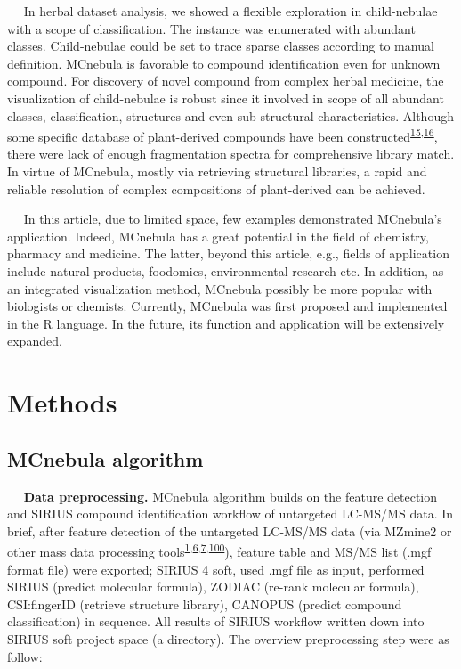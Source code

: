    In herbal dataset analysis, we showed a flexible exploration in
child-nebulae with a scope of classification. The instance was
enumerated with abundant classes. Child-nebulae could be set to trace
sparse classes according to manual definition. MCnebula is favorable to
compound identification even for unknown compound. For discovery of
novel compound from complex herbal medicine, the visualization of
child-nebulae is robust since it involved in scope of all abundant
classes, classification, structures and even sub-structural
characteristics. Although some specific database of plant-derived
compounds have been
constructed\textsuperscript{\protect\hyperlink{ref-2012ac}{15},\protect\hyperlink{ref-2015ak}{16}},
there were lack of enough fragmentation spectra for comprehensive
library match. In virtue of MCnebula, mostly via retrieving structural
libraries, a rapid and reliable resolution of complex compositions of
plant-derived can be achieved.

   In this article, due to limited space, few examples demonstrated
MCnebula's application. Indeed, MCnebula has a great potential in the
field of chemistry, pharmacy and medicine. The latter, beyond this
article, e.g., fields of application include natural products,
foodomics, environmental research etc. In addition, as an integrated
visualization method, MCnebula possibly be more popular with biologists
or chemists. Currently, MCnebula was first proposed and implemented in
the R language. In the future, its function and application will be
extensively expanded.

\hypertarget{methods}{%
\section{\texorpdfstring{\textbf{Methods}}{Methods}}\label{methods}}

\hypertarget{mcnebula-algorithm}{%
\subsection{\texorpdfstring{\textbf{MCnebula
algorithm}}{MCnebula algorithm}}\label{mcnebula-algorithm}}

   \textbf{Data preprocessing.} MCnebula algorithm builds on the feature
detection and SIRIUS compound identification workflow of untargeted
LC-MS/MS data. In brief, after feature detection of the untargeted
LC-MS/MS data (via MZmine2 or other mass data processing
tools\textsuperscript{\protect\hyperlink{ref-2020p}{1},\protect\hyperlink{ref-2016e}{6},\protect\hyperlink{ref-2006a}{7},\protect\hyperlink{ref-2010a}{100}}),
feature table and MS/MS list (.mgf format file) were exported; SIRIUS 4
soft, used .mgf file as input, performed SIRIUS (predict molecular
formula), ZODIAC (re-rank molecular formula), CSI:fingerID (retrieve
structure library), CANOPUS (predict compound classification) in
sequence. All results of SIRIUS workflow written down into SIRIUS soft
project space (a directory). The overview preprocessing step were as
follow:


